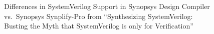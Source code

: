 
\begin{figure}[t]
    \centering
    \caption[
        Inconsistencies in SystemVerilog Support in synthesis tools
    ]{
        Differences in SystemVerilog Support in Synopsys Design Compiler vs.\ Synopsys Synplify-Pro from \enquote{Synthesizing SystemVerilog: Busting the Myth that SystemVerilog is only for Verification} \cite{sutherland}
    }
    \label{fig:dc_vs_synplify}
\end{figure}
